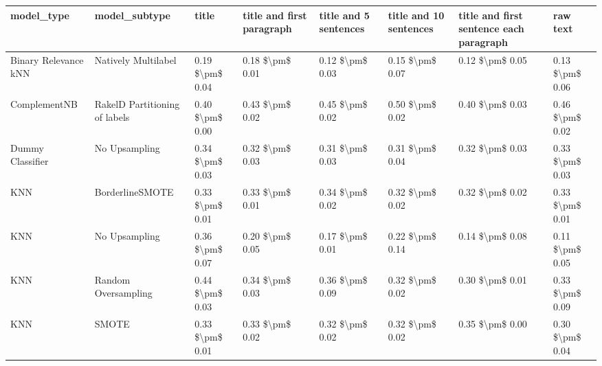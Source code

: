 \begin{tabular}{llllllll}
\toprule
                     model\_type &                 model\_subtype &           title & title and first paragraph & title and 5 sentences & title and 10 sentences & title and first sentence each paragraph &            raw text \\
\midrule
           Binary Relevance kNN &           Natively Multilabel & 0.19 \$\textbackslash pm\$ 0.04 &           0.18 \$\textbackslash pm\$ 0.01 &       0.12 \$\textbackslash pm\$ 0.03 &        0.15 \$\textbackslash pm\$ 0.07 &                         0.12 \$\textbackslash pm\$ 0.05 &     0.13 \$\textbackslash pm\$ 0.06 \\
                   ComplementNB & RakelD Partitioning of labels & 0.40 \$\textbackslash pm\$ 0.00 &           0.43 \$\textbackslash pm\$ 0.02 &       0.45 \$\textbackslash pm\$ 0.02 &        0.50 \$\textbackslash pm\$ 0.02 &                         0.40 \$\textbackslash pm\$ 0.03 &     0.46 \$\textbackslash pm\$ 0.02 \\
               Dummy Classifier &                 No Upsampling & 0.34 \$\textbackslash pm\$ 0.03 &           0.32 \$\textbackslash pm\$ 0.03 &       0.31 \$\textbackslash pm\$ 0.03 &        0.31 \$\textbackslash pm\$ 0.04 &                         0.32 \$\textbackslash pm\$ 0.03 &     0.33 \$\textbackslash pm\$ 0.03 \\
                            KNN &               BorderlineSMOTE & 0.33 \$\textbackslash pm\$ 0.01 &           0.33 \$\textbackslash pm\$ 0.01 &       0.34 \$\textbackslash pm\$ 0.02 &        0.32 \$\textbackslash pm\$ 0.02 &                         0.32 \$\textbackslash pm\$ 0.02 &     0.33 \$\textbackslash pm\$ 0.01 \\
                            KNN &                 No Upsampling & 0.36 \$\textbackslash pm\$ 0.07 &           0.20 \$\textbackslash pm\$ 0.05 &       0.17 \$\textbackslash pm\$ 0.01 &        0.22 \$\textbackslash pm\$ 0.14 &                         0.14 \$\textbackslash pm\$ 0.08 &     0.11 \$\textbackslash pm\$ 0.05 \\
                            KNN &           Random Oversampling & 0.44 \$\textbackslash pm\$ 0.03 &           0.34 \$\textbackslash pm\$ 0.03 &       0.36 \$\textbackslash pm\$ 0.09 &        0.32 \$\textbackslash pm\$ 0.02 &                         0.30 \$\textbackslash pm\$ 0.01 &     0.33 \$\textbackslash pm\$ 0.09 \\
                            KNN &                         SMOTE & 0.33 \$\textbackslash pm\$ 0.01 &           0.33 \$\textbackslash pm\$ 0.02 &       0.32 \$\textbackslash pm\$ 0.02 &        0.32 \$\textbackslash pm\$ 0.02 &                         0.35 \$\textbackslash pm\$ 0.00 &     0.30 \$\textbackslash pm\$ 0.04 \\

\end{tabular}
